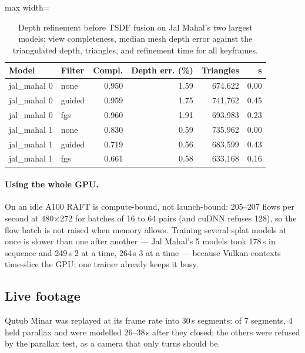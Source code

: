 \begin{table}[htbp]
\centering\small
\caption{Depth refinement before TSDF fusion on Jal Mahal's two largest models: view completeness, median mesh depth error against the triangulated depth, triangles, and refinement time for all keyframes.}\label{tab:refine}
\begin{adjustbox}{max width=\linewidth}
\begin{tabular}{llrrrr}
\toprule
Model & Filter & Compl. & Depth err. (\%) & Triangles & s \\
\midrule
jal\_mahal 0 & none & 0.950 & 1.59 & 674{,}622 & 0.00 \\
jal\_mahal 0 & guided & 0.959 & 1.75 & 741{,}762 & 0.45 \\
jal\_mahal 0 & fgs & 0.960 & 1.91 & 693{,}983 & 0.23 \\
jal\_mahal 1 & none & 0.830 & 0.59 & 735{,}962 & 0.00 \\
jal\_mahal 1 & guided & 0.719 & 0.56 & 683{,}599 & 0.43 \\
jal\_mahal 1 & fgs & 0.661 & 0.58 & 633{,}168 & 0.16 \\
\bottomrule
\end{tabular}
\end{adjustbox}
\end{table}

\paragraph{Using the whole GPU.} On an idle A100 RAFT is compute-bound, not launch-bound: 205--207 flows per second at 480$\times$272 for batches of 16 to 64 pairs (and cuDNN refuses 128), so the flow batch is not raised when memory allows. Training several splat models at once is slower than one after another --- Jal Mahal's 5 models took 178\,s in sequence and 249\,s 2 at a time, 264\,s 3 at a time --- because Vulkan contexts time-slice the GPU; one trainer already keeps it busy.

\subsection{Live footage}\label{sec:live-results}
Qutub Minar was replayed at its frame rate into 30\,s segments: of 7 segments, 4 held parallax and were modelled 26--38\,s after they closed; the others were refused by the parallax test, as a camera that only turns should be.
